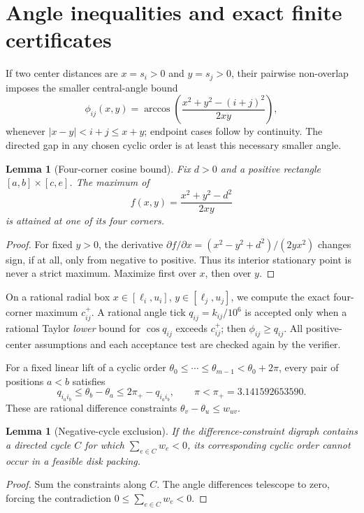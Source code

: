 \documentclass[11pt,a4paper]{article}
\newtheorem{lemma}[theorem]{Lemma}
\begin{document}
\section{Angle inequalities and exact finite certificates}
If two center distances are $x=s_i>0$ and $y=s_j>0$, their pairwise
non-overlap imposes the smaller central-angle bound
\begin{equation}\label{eq:phi}
 \phi_{ij}(x,y)=\arccos\left(\frac{x^2+y^2-(i+j)^2}{2xy}\right),
\end{equation}
whenever $|x-y|<i+j\le x+y$; endpoint cases follow by continuity.
The directed gap in any chosen cyclic order is at least this necessary
smaller angle.

\begin{lemma}[Four-corner cosine bound]\label{lem:corners}
Fix $d>0$ and a positive rectangle $[a,b]\times[c,e]$.  The maximum of
\[
  f(x,y)=\frac{x^2+y^2-d^2}{2xy}
\]
is attained at one of its four corners.
\end{lemma}
\begin{proof}
For fixed $y>0$, the derivative
$\partial f/\partial x=(x^2-y^2+d^2)/(2yx^2)$ changes sign, if at all,
only from negative to positive.  Thus its interior stationary point is
never a strict maximum.  Maximize first over $x$, then over $y$.
\end{proof}

On a rational radial box $x\in[\ell_i,u_i]$,
$y\in[\ell_j,u_j]$, we compute the exact four-corner maximum $c_{ij}^+$.
A rational angle tick $q_{ij}=k_{ij}/10^6$ is accepted only when a
rational Taylor \emph{lower} bound for $\cos q_{ij}$ exceeds $c_{ij}^+$;
then $\phi_{ij}\ge q_{ij}$.  All positive-center assumptions and each
acceptance test are checked again by the verifier.

For a fixed linear lift of a cyclic order
$\theta_0\le\cdots\le\theta_{m-1}<\theta_0+2\pi$, every pair of positions
$a<b$ satisfies
\begin{equation}\label{eq:diff}
 q_{i_ai_b}\le\theta_b-\theta_a\le2\pi_+-q_{i_ai_b},
 \qquad \pi<\pi_+=3.141592653590.
\end{equation}
These are rational difference constraints
$\theta_v-\theta_u\le w_{uv}$.

\begin{lemma}[Negative-cycle exclusion]\label{lem:neg}
If the difference-constraint digraph contains a directed cycle $C$ for
which $\sum_{e\in C}w_e<0$, its corresponding cyclic order cannot occur
in a feasible disk packing.
\end{lemma}
\begin{proof}
Sum the constraints along $C$.  The angle differences telescope to zero,
forcing the contradiction $0\le\sum_{e\in C}w_e<0$.
\end{proof}
\end{document}
